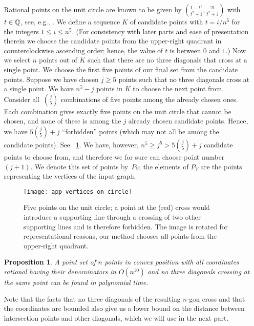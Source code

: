 \documentclass[11pt,a4paper]{article}
\newtheorem{proposition}[theorem]{Proposition}
\begin{document}
Rational points on the unit circle are known to be given by $\left (\frac{1-t^2}{t^2+1}, \frac{2t}{t^2+1} \right )$ with $t \in \mathbb{Q}$, see, e.g., \cite{canny}.
We define a sequence $K$ of candidate points with $t = i/n^5$ for the integers $1 \leq i \leq n^5$.
(For consistency with later parts and ease of presentation therein we choose the candidate points from the upper-right quadrant in counterclockwise ascending order; hence, the value of $t$ is between $0$ and $1$.)
Now we select $n$ points out of $K$ such that there are no three diagonals that cross at a single point.
We choose the first five points of our final set from the candidate points.
Suppose we have chosen $j \geq 5$ points such that no three diagonals cross at a single point.
We have $n^5 - j$ points in $K$ to choose the next point from.
Consider all~$\binom{j}{5}$ combinations of five points among the already chosen ones.
Each combination gives exactly five points on the unit circle that cannot be chosen, and none of these is among the $j$ already chosen candidate points.
Hence, we have $5 \binom{j}{5} + j$ ``forbidden'' points (which may not all be among the candidate points).
See \figurename~\ref{fig_app_vertices_on_circle}.
We have, however, $n^5 \geq j^5 > 5\binom{j}{5} + j$ candidate points to choose from, and therefore we for sure can choose point number $(j+1)$.
We denote this set of points by~$P_V$; the elements of $P_V$ are the points representing the vertices of the input graph.

\begin{figure}
\centering
\texttt{[image: app\_vertices\_on\_circle]}
\caption{Five points on the unit circle; a point at the (red) cross would introduce a supporting line through a crossing of two other supporting lines and is therefore forbidden.
The image is rotated for representational reasons, our method chooses all points from the upper-right quadrant.
}
\label{fig_app_vertices_on_circle}
\end{figure}


\begin{proposition}
A point set of $n$ points in convex position with all coordinates rational having their denominators in $O(n^{10})$ and no three diagonals crossing at the same point can be found in polynomial time.
\end{proposition}

Note that the facts that no three diagonals of the resulting $n$-gon cross and that the coordinates are bounded also give us a lower bound on the distance between intersection points and other diagonals, which we will use in the next part.
\end{document}
